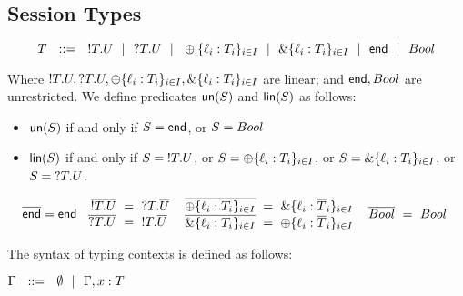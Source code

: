 \subsection{Session Types}
\begin{definition}
  \label{def:session_types}
	\vspace{-2mm}
	\[
		T	\ \ ::=\ \ 	{}!T. U
			\ \ |\ \ 		{}?T. U
			\ \ |\ \ 		\oplus\{{\ell}_i: {T}_i\}_{i\in I}
			\ \ |\ \ 		\&\{{\ell}_i\mathrel:{T}_i\}_{i\in I}
			\ \ |\ \ 		\mathsf{end}
			\ \ |\ \ 		Bool
	\]
\end{definition}
\vspace{-2mm}
Where $ {}!T. U,	{}?T. U,	\oplus\{{\ell}_i: {T}_i\}_{i\in I}, \&\{{\ell}_i\mathrel:{T}_i\}_{i\in I}$ are linear; and $\mathsf{end}, Bool$ are unrestricted. We define predicates $\mathsf{un}(S)$ and $\mathsf{lin}(S)$ as follows:
\begin{itemize}
	\item $\mathsf{un}(S)$ if and only if $S = \mathsf{end} $, or $ S = Bool$
	\item $\mathsf{lin}(S)$ if and only if $S = {}!T. U $, or $S = \oplus\{{\ell}_i: {T}_i\}_{i\in I} $, or $S = \&\{{\ell}_i\mathrel:{T}_i\}_{i\in I} $, or $S = {}?T. U $.
\end{itemize}

\begin{definition}
\label{def:duality}
\vspace{-2mm}
\[
	\arraycolsep=3pt
	\begin{array}{cccc}
		\tdual\tend	=	\tend
		&
		\begin{array}{rcl}
			\tdual{\tout T U}	&=&	\tin T \tdual U \\
			\tdual{\tin T U}		&=&	\tout T \tdual U \\
		\end{array}
		&
		\begin{array}{rcl}
			\tdual{\tselI{\ell}{T}}	&=&	\tbranchI{\ell}{\tdual{T}} \\
			\tdual{\tbranchI{\ell}{T}} &=&	\tselI{\ell}{\tdual{T}} \\
		\end{array}
		&
		\begin{array}{rcl}
			\tdual{\tvar Bool}			&=&	\tvar Bool \\
		\end{array}
	\end{array}
\]
\end{definition}


\begin{definition}
	\label{def:typing_context}
The syntax of typing contexts is defined as follows:

		$\Gamma \ \ ::=\ \  \emptyset \ \ |\ \  \Gamma, x: T$
\end{definition}

